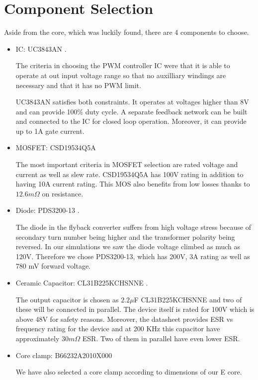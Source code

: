 \documentclass[12pt]{article}
\begin{document}
    
\section{Component Selection}

    Aside from the core, which was luckily found, there are 4 components to choose.
\begin{itemize}
    \item IC: UC3843AN \cite{ic}. 

    The criteria in choosing the PWM controller IC were that it is able to operate at out input voltage range so that no auxilliary windings are necessary and that it has no PWM limit. 

    UC3843AN satisfies both constraints. It operates at voltages higher than 8V and can provide 100\% duty cycle. A separate feedback network can be built and connected to the IC for closed loop operation. Moreover, it can provide up to 1A gate current. 

    \item MOSFET: CSD19534Q5A \cite{mos}

    The most important criteria in MOSFET selection are rated voltage and current as well as slew rate. CSD19534Q5A has 100V rating in addition to having 10A current rating. This MOS also benefits from low losses thanks to $12.6 m\Omega$ on resistance.  

    \item Diode: PDS3200-13 \cite{diode}.

    The diode in the flyback converter suffers from high voltage stress because of secondary turn number being higher and the transformer polarity being reversed. In our simulations we saw the diode voltage climbed as much as 120V. Therefore we chose PDS3200-13, which has 200V, 3A rating as well as 780 mV forward voltage.

    \item Ceramic Capacitor: CL31B225KCHSNNE \cite{cap}.

    The output capacitor is chosen as $2.2\mu$F CL31B225KCHSNNE and two of these will be connected in parallel. The device itself is rated for 100V which is above 48V for safety reasons. Moreover,  the datasheet provides ESR vs frequency rating for the device and at 200 KHz this capacitor have approximately $30m\Omega$ ESR. Two of them in parallel have even lower ESR.

    \item Core clamp: B66232A2010X000 \cite{clamp}

    We have also selected a core clamp according to dimensions of our E core.
\end{itemize}
\end{document}
